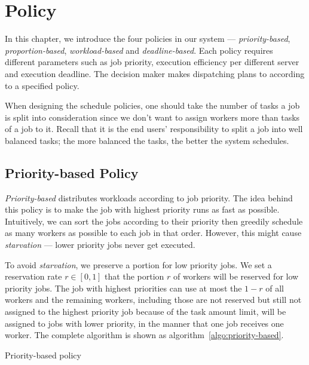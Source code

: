 \chapter{Policy}

In this chapter, we introduce the four policies in our system ---
\emph{priority-based}, \emph{proportion-based}, \emph{workload-based}
and \emph{deadline-based}.
Each policy requires different parameters such as job priority,
execution efficiency per different server and execution deadline.
The decision maker makes dispatching plans to according to a specified
policy.

When designing the schedule policies, one should take the number of
tasks a job is split into consideration since we don't want to assign
workers more than tasks of a job to it.
Recall that it is the end users' responsibility to split a job into well
balanced tasks; the more balanced the tasks, the better the system
schedules.


\section{Priority-based Policy}

\emph{Priority-based} distributes workloads according to job priority. 
The idea behind this policy is to make the job with highest priority runs as
fast as possible.
Intuitively, we can sort the jobs according to their priority then greedily
schedule as many workers as possible to each job in that order.
However, this might cause \emph{starvation} --- lower priority jobs
never get executed.


To avoid \emph{starvation}, we preserve a portion for low priority jobs.
We set a reservation rate $r \in [0,1]$ that the portion $r$ of workers
will be reserved for low priority jobs.
The job with highest priorities can use at most the $1-r$ of all workers
and the remaining workers, including those are not reserved but still not
assigned to the highest priority job because of the task amount limit,
will be assigned to jobs with lower priority, in the manner that one job
receives one worker.
The complete algorithm is shown as algorithm~\ref{algo:priority-based}.

\begin{algorithm}[H]
  \DontPrintSemicolon %
  
  \caption{Priority-based policy}
  \label{algo:priority-based}
\end{algorithm}

